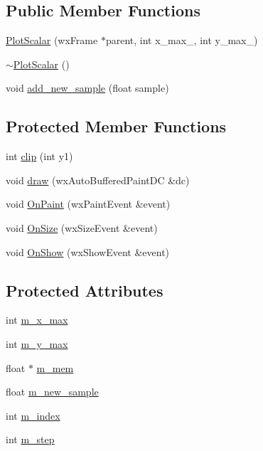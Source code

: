 \subsection*{Public Member Functions}
\begin{DoxyCompactItemize}
\item 
\hyperlink{class_plot_scalar_a53c9d8fbf1e4420dd1fc27910fb02403}{Plot\-Scalar} (wx\-Frame $\ast$parent, int x\-\_\-max\-\_\-, int y\-\_\-max\-\_\-)
\item 
\hyperlink{class_plot_scalar_afae3d26ba9a96f81c84d87a2b0a29a48}{$\sim$\-Plot\-Scalar} ()
\item 
void \hyperlink{class_plot_scalar_a0d910560ef24c40c5aab8540c6dd82c2}{add\-\_\-new\-\_\-sample} (float sample)
\end{DoxyCompactItemize}
\subsection*{Protected Member Functions}
\begin{DoxyCompactItemize}
\item 
int \hyperlink{class_plot_scalar_ad2c5214849ba51b85c61e5ed1949b28e}{clip} (int y1)
\item 
void \hyperlink{class_plot_scalar_aa901215be79b5a522c416224c6554cf3}{draw} (wx\-Auto\-Buffered\-Paint\-D\-C \&dc)
\item 
void \hyperlink{class_plot_scalar_a8e31e0b1a2415d7bdf8a4c521dbc2e8d}{On\-Paint} (wx\-Paint\-Event \&event)
\item 
void \hyperlink{class_plot_scalar_a6b41cd9d409567b395f539d0204c706c}{On\-Size} (wx\-Size\-Event \&event)
\item 
void \hyperlink{class_plot_scalar_acb95980f2589a99431b5e358c98a91f2}{On\-Show} (wx\-Show\-Event \&event)
\end{DoxyCompactItemize}
\subsection*{Protected Attributes}
\begin{DoxyCompactItemize}
\item 
int \hyperlink{class_plot_scalar_a9a9edfbd8517f1ce1e7b75bcd4fda4f5}{m\-\_\-x\-\_\-max}
\item 
int \hyperlink{class_plot_scalar_a91ce24595550dd2c4add253025ba668c}{m\-\_\-y\-\_\-max}
\item 
float $\ast$ \hyperlink{class_plot_scalar_a28e4e09d513bce7b2890635d1ed1967d}{m\-\_\-mem}
\item 
float \hyperlink{class_plot_scalar_a963d1a8e34175f7d3b1f82fa4e71ae19}{m\-\_\-new\-\_\-sample}
\item 
int \hyperlink{class_plot_scalar_a3ff0dec7b8f50b3ca7155c06e8877ab5}{m\-\_\-index}
\item 
int \hyperlink{class_plot_scalar_a8e057f0175729eea2a6e8ec5597bb1c0}{m\-\_\-step}
\end{DoxyCompactItemize}
